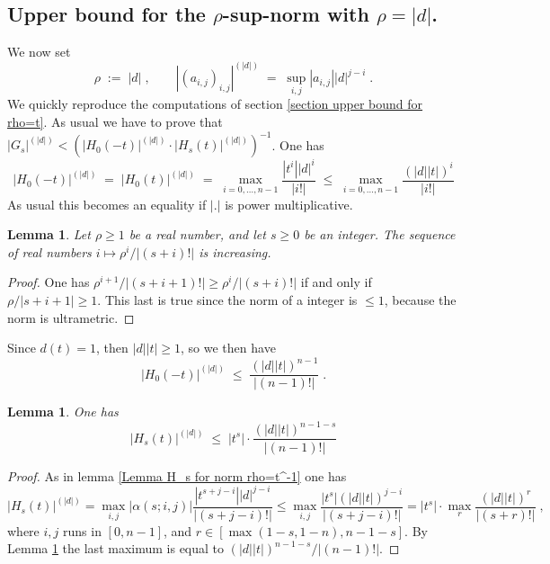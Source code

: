\documentclass{compositio}
\newtheorem{lemma}[theorem]{Lemma}
\numberwithin{equation}{section}
\begin{document}
\subsection{Upper bound for the $\rho$-sup-norm with $\rho=|d|$.}
We now set 
\begin{equation}
\rho\;:=\;|d|\;,\qquad|(a_{i,j})_{i,j}|^{(|d|)}\;=\;\sup_{i,j}|a_{i,j}||d|^{j-i}\;.
\end{equation}
We quickly reproduce the computations of section \ref{section upper bound for rho=t}. As usual we have to prove that
$|G_s|^{(|d|)}<(|H_0(-t)|^{(|d|)}\cdot|H_s(t)|^{(|d|)})^{-1}$. One has 
\begin{equation}
|H_0(-t)|^{(|d|)}\;=\;|H_0(t)|^{(|d|)}\;=\;\max_{i=0,\ldots,n-1}\frac{|t^i||d|^{i}}{|i!|}\;\leq\;
\max_{i=0,\ldots,n-1}\frac{(|d||t|)^{i}}{|i!|}
\end{equation}
As usual this becomes an equality if $|.|$ is power multiplicative.
\begin{lemma}\label{increasing if rho>1}
Let $\rho\geq 1$ be a real number, and let $s\geq 0$ be an integer. The sequence of real numbers $i\mapsto 
\rho^i/|(s+i)!|$ is increasing.
\end{lemma}
\begin{proof}
One has $\rho^{i+1}/|(s+i+1)!|\geq\rho^i/|(s+i)!|$ if and only if $\rho/|s+i+1|\geq 1$. This last is true since the 
norm of a integer is $\leq 1$, because the norm is ultrametric.
\end{proof}
Since $d(t)=1$, then $|d||t|\geq 1$, so we then have
\begin{equation}
|H_0(-t)|^{(|d|)}\;\leq\;\frac{(|d||t|)^{n-1}}{|(n-1)!|}\;.
\end{equation}
\begin{lemma}
One has
\begin{equation}
|H_s(t)|^{(|d|)}\;\leq\;|t^s|\cdot\frac{(|d||t|)^{n-1-s}}{|(n-1)!|}
\end{equation}
\end{lemma}
\begin{proof}
As in lemma \ref{Lemma H_s for norm rho=t^-1} one has 
\begin{equation}
|H_s(t)|^{(|d|)}=\max_{i,j}|\alpha(s;i,j)|\frac{|t^{s+j-i}||d|^{j-i}}{|(s+j-i)!|}\leq
\max_{i,j}\frac{|t^{s}|(|d||t|)^{j-i}}{|(s+j-i)!|}=
|t^{s}|\cdot\max_{r}\frac{(|d||t|)^{r}}{|(s+r)!|}\;,
\end{equation}
where $i,j$ runs in $[0,n-1]$, and $r\in[\max(1-s,1-n),n-1-s]$. By Lemma \ref{increasing if rho>1} the last maximum is 
equal to $(|d||t|)^{n-1-s}/|(n-1)!|$.
\end{proof}
\end{document}
